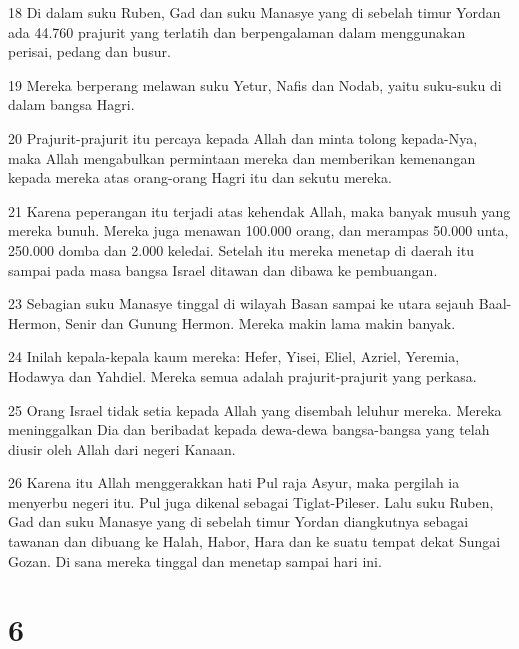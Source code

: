 \par 18 Di dalam suku Ruben, Gad dan suku Manasye yang di sebelah timur Yordan ada 44.760 prajurit yang terlatih dan berpengalaman dalam menggunakan perisai, pedang dan busur.
\par 19 Mereka berperang melawan suku Yetur, Nafis dan Nodab, yaitu suku-suku di dalam bangsa Hagri.
\par 20 Prajurit-prajurit itu percaya kepada Allah dan minta tolong kepada-Nya, maka Allah mengabulkan permintaan mereka dan memberikan kemenangan kepada mereka atas orang-orang Hagri itu dan sekutu mereka.
\par 21 Karena peperangan itu terjadi atas kehendak Allah, maka banyak musuh yang mereka bunuh. Mereka juga menawan 100.000 orang, dan merampas 50.000 unta, 250.000 domba dan 2.000 keledai. Setelah itu mereka menetap di daerah itu sampai pada masa bangsa Israel ditawan dan dibawa ke pembuangan.
\par 23 Sebagian suku Manasye tinggal di wilayah Basan sampai ke utara sejauh Baal-Hermon, Senir dan Gunung Hermon. Mereka makin lama makin banyak.
\par 24 Inilah kepala-kepala kaum mereka: Hefer, Yisei, Eliel, Azriel, Yeremia, Hodawya dan Yahdiel. Mereka semua adalah prajurit-prajurit yang perkasa.
\par 25 Orang Israel tidak setia kepada Allah yang disembah leluhur mereka. Mereka meninggalkan Dia dan beribadat kepada dewa-dewa bangsa-bangsa yang telah diusir oleh Allah dari negeri Kanaan.
\par 26 Karena itu Allah menggerakkan hati Pul raja Asyur, maka pergilah ia menyerbu negeri itu. Pul juga dikenal sebagai Tiglat-Pileser. Lalu suku Ruben, Gad dan suku Manasye yang di sebelah timur Yordan diangkutnya sebagai tawanan dan dibuang ke Halah, Habor, Hara dan ke suatu tempat dekat Sungai Gozan. Di sana mereka tinggal dan menetap sampai hari ini.

\chapter{6}

